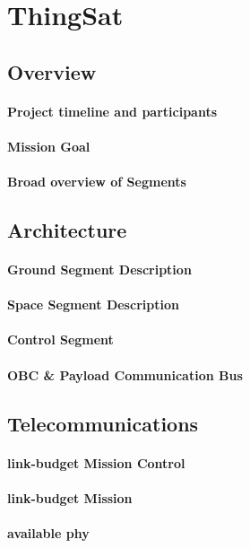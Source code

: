 
\section{ThingSat}
\label{sec:case-study}

\subsection{Overview}

\paragraph*{Project timeline and participants}
\paragraph*{Mission Goal}
\paragraph*{Broad overview of Segments}

\subsection{Architecture} 
\paragraph*{Ground Segment Description}
\paragraph*{Space Segment Description}
\paragraph*{Control Segment} %
\paragraph*{OBC \& Payload Communication Bus}

\subsection{Telecommunications} 
\paragraph*{link-budget Mission Control} 
\paragraph*{link-budget Mission} 
\paragraph*{available phy} 

